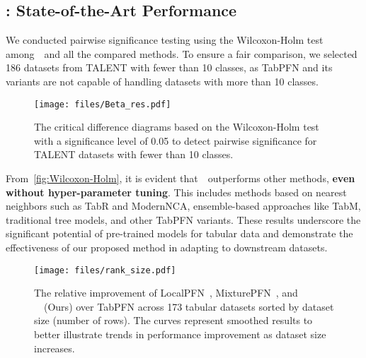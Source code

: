 \subsection{\name: State-of-the-Art Performance}
We conducted pairwise significance testing using the Wilcoxon-Holm test~\cite{Demsar06Statistical} among~\name~and all the compared methods. To ensure a fair comparison, we selected 186 datasets from TALENT with fewer than 10 classes, as TabPFN and its variants are not capable of handling datasets with more than 10 classes.
\begin{figure}[t]
    \centering
    \texttt{[image: files/Beta\_res.pdf]}
    \vspace{-5mm}
    \caption{The critical difference diagrams based on the Wilcoxon-Holm test with a significance level
of 0.05 to detect pairwise significance for TALENT datasets with fewer than 10 classes.}
    \label{fig:Wilcoxon-Holm}
    \vspace{-5mm}
\end{figure}
From~\autoref{fig:Wilcoxon-Holm}, it is evident that~\name~outperforms other methods, \textbf{even without hyper-parameter tuning}. This includes methods based on nearest neighbors such as TabR and ModernNCA, ensemble-based approaches like TabM, traditional tree models, and other TabPFN variants. These results underscore the significant potential of pre-trained models for tabular data and demonstrate the effectiveness of our proposed method in adapting to downstream datasets. %

\begin{figure}[t]
    \centering
    \vspace{-3mm}
    \texttt{[image: files/rank\_size.pdf]}
    \vspace{-5mm}
    \caption{The relative improvement of LocalPFN~\cite{LocalPFN}, MixturePFN~\cite{MixturePFN}, and ~\name~(Ours) over TabPFN across 173 tabular datasets sorted by dataset size (number of rows). The curves represent smoothed results to better illustrate trends in performance improvement as dataset size increases.}
    \label{fig:relative_improvement}
    \vspace{-5mm}
\end{figure}

